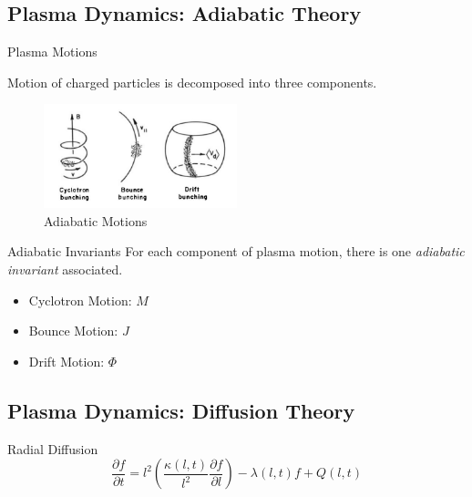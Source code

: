 \documentclass{beamer}
\begin{document}
\subsection{Plasma Dynamics:  Adiabatic Theory}

\begin{frame}{Plasma Motions}

  Motion of charged particles is decomposed into three components.
  
   \begin{figure}[h]
        \includegraphics[width=0.5\textwidth]{adiabatic_motions}
        \caption{Adiabatic Motions}
        \label{fig:Adiabatic}
      \end{figure}
\end{frame}

\begin{frame}{Adiabatic Invariants}
  For each component of plasma motion, there is one \emph{adiabatic
    invariant} associated.

  \begin{itemize}
  \item<1->{
      Cyclotron Motion: $M$
    }
  \item<2->{
      Bounce Motion: $J$
    }
  \item<3->{
      Drift Motion: $\Phi$
    }
  \end{itemize}

\end{frame}

\subsection{Plasma Dynamics: Diffusion Theory}

\begin{frame}{Radial Diffusion}
  \begin{equation}
    \frac{\partial{f}}{\partial{t}} = l^2 \left( \frac{\kappa(l,
        t)}{l^{2}} \frac{\partial{f}}{\partial{l}} \right) - \lambda(l,
    t) f +  Q(l, t)
  \end{equation}

  
\end{frame}
\end{document}
